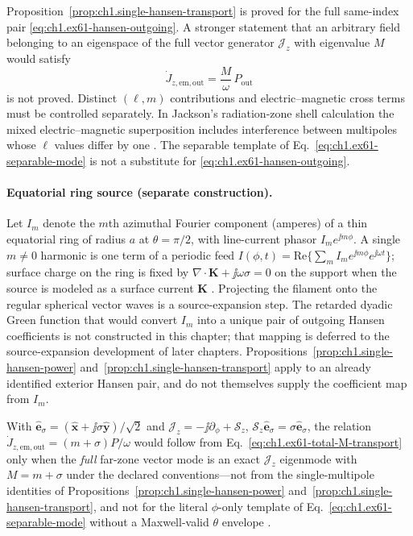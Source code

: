 \begin{remark}
\label{rem:ch1.am-power-target}
Proposition~\ref{prop:ch1.single-hansen-transport} is proved for the full same-index pair \eqref{eq:ch1.ex61-hansen-outgoing}. A stronger statement that an arbitrary field belonging to an eigenspace of the full vector generator $\mathcal{J}_z$ with eigenvalue $M$ would satisfy
\begin{equation}
\label{eq:ch1.ex61-total-M-transport}
\dot J_{z,\mathrm{em,out}}=\frac{M}{\omega}\,P_{\mathrm{out}}
\end{equation}
is not proved. Distinct $(\ell,m)$ contributions and electric--magnetic cross terms must be controlled separately. In Jackson's radiation-zone shell calculation the mixed electric--magnetic superposition includes interference between multipoles whose $\ell$ values differ by one \cite[Eq.~(9.145)]{jackson1999}. The separable template of Eq.~\eqref{eq:ch1.ex61-separable-mode} is not a substitute for \eqref{eq:ch1.ex61-hansen-outgoing}.
\end{remark}

\paragraph{Equatorial ring source (separate construction).}
Let $I_m$ denote the $m$th azimuthal Fourier component (amperes) of a thin equatorial ring of radius $a$ at $\theta=\pi/2$, with line-current phasor $I_m e^{\jj m\phi}$. A single $m\neq0$ harmonic is one term of a periodic feed $I(\phi,t)=\mathrm{Re}\{\sum_m I_m e^{\jj m\phi}e^{\jj\omega t}\}$; surface charge on the ring is fixed by $\nabla\cdot\mathbf K+\jj\omega\sigma=0$ on the support when the source is modeled as a surface current $\mathbf K$ \cite{stratton1941}. Projecting the filament onto the regular spherical vector waves is a source-expansion step. The retarded dyadic Green function that would convert $I_m$ into a unique pair of outgoing Hansen coefficients is not constructed in this chapter; that mapping is deferred to the source-expansion development of later chapters. Propositions~\ref{prop:ch1.single-hansen-power} and~\ref{prop:ch1.single-hansen-transport} apply to an already identified exterior Hansen pair, and do not themselves supply the coefficient map from $I_m$.
\begin{corollary}[Fixed-axis spin plus azimuth only when $M=m+\sigma_z$ is proved]
\label{cor:ch1.m-plus-sigma}
With $\hat{\mathbf{e}}_\sigma=(\hat{\mathbf{x}}+\jj\sigma\hat{\mathbf{y}})/\sqrt{2}$ and $\mathcal{J}_z=-\jj\partial_\phi+\mathcal{S}_z$, $\mathcal{S}_z\hat{\mathbf{e}}_\sigma=\sigma\hat{\mathbf{e}}_\sigma$, the relation $\dot J_{z,\mathrm{em,out}}=(m+\sigma)P/\omega$ would follow from Eq.~\eqref{eq:ch1.ex61-total-M-transport} only when the \emph{full} far-zone vector mode is an exact $\mathcal{J}_z$ eigenmode with $M=m+\sigma$ under the declared conventions---not from the single-multipole identities of Propositions~\ref{prop:ch1.single-hansen-power} and~\ref{prop:ch1.single-hansen-transport}, and not for the literal $\phi$-only template of Eq.~\eqref{eq:ch1.ex61-separable-mode} without a Maxwell-valid $\theta$ envelope \cite{allen1992,cerjan2011,monteiro2009}.
\end{corollary}

